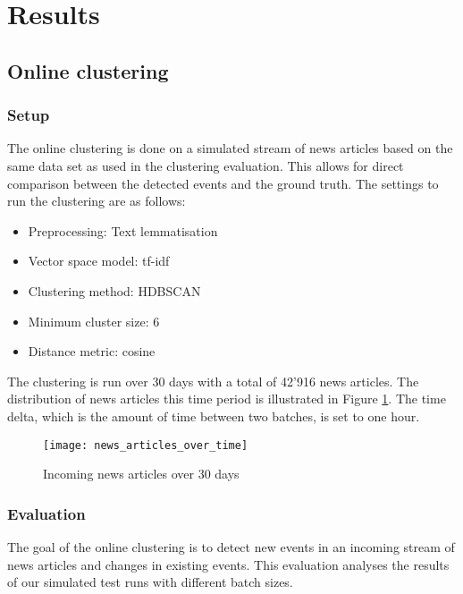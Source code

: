 \section{Results}

\subsection{Online clustering}

\subsubsection{Setup}

The online clustering is done on a simulated stream of news articles based on the same data set as used in the clustering evaluation. This allows for direct comparison between the detected events and the ground truth. The settings to run the clustering are as follows:

\begin{itemize}
    \item Preprocessing: Text lemmatisation
    \item Vector space model: tf-idf
    \item Clustering method: HDBSCAN
    \item Minimum cluster size: 6
    \item Distance metric: cosine
\end{itemize}

The clustering is run over 30 days with a total of 42'916 news articles. The distribution of news articles this time period is illustrated in Figure \ref{fig:news_articles_over_time}. The time delta, which is the amount of time between two batches, is set to one hour. 

\begin{figure}[h]
    \centering
    \texttt{[image: news\_articles\_over\_time]}
    \caption{Incoming news articles over 30 days}
    \label{fig:news_articles_over_time}
\end{figure}

\subsubsection{Evaluation}

The goal of the online clustering is to detect new events in an incoming stream of news articles and changes in existing events. This evaluation analyses the results of our simulated test runs with different batch sizes.

